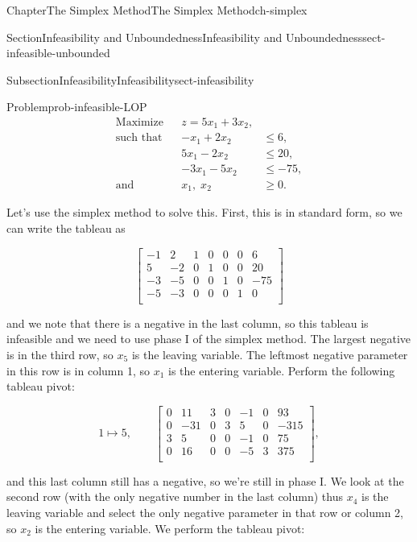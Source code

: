 \documentclass[oneside,10pt,]{book}
\numberwithin{equation}{section}
\newcommand{\amp}{&}
\begin{document}
\begin{chapterptx}{Chapter}{The Simplex Method}{}{The Simplex Method}{}{}{ch-simplex}
\begin{sectionptx}{Section}{Infeasibility and Unboundedness}{}{Infeasibility and Unboundedness}{}{}{sect-infeasible-unbounded}
\begin{subsectionptx}{Subsection}{Infeasibility}{}{Infeasibility}{}{}{sect-infeasibility}
\begin{problem}{Problem}{}{prob-infeasible-LOP}
%
\begin{equation*}
\begin{aligned} \text{Maximize} \amp \amp z  = 5x_1 + 3x_2, \amp \\ \text{such that} \amp\amp  -x_1 +2x_2 \amp \leq 6, \\ \amp\amp 5x_1 -2x_2 \amp \leq 20, \\ \amp\amp -3x_1 - 5x_2 \amp \leq -75,\\ \text{and} \amp\amp x_1, \; x_2 \amp \geq 0.
\end{aligned}
\end{equation*}
%
\end{problem}
Let's use the simplex method to solve this. First, this is in standard form, so we can write the tableau as%
\par
%
\begin{equation*}
\left[\begin{array}{rr|rrrr|r} -1 \amp 2 \amp 1 \amp 0 \amp 0 \amp 0 \amp 6\\ 5 \amp -2 \amp 0 \amp 1 \amp 0 \amp 0 \amp 20\\ -3 \amp -5 \amp 0 \amp 0 \amp 1 \amp 0 \amp -75\\ \hline -5 \amp -3 \amp 0 \amp 0 \amp 0 \amp 1 \amp 0\\ \end{array} \right]
\end{equation*}
%
\par
and we note that there is a negative in the last column, so this tableau is infeasible and we need to use phase I of the simplex method. The largest negative is in the third row, so \(x_5\) is the leaving variable.  The leftmost negative parameter in this row is in column 1, so \(x_1\) is the entering variable.  Perform the following tableau pivot:%
\par
%
\begin{equation*}
1 \mapsto 5, \qquad \left[\begin{array}{rr|rrrr|r} 0 \amp 11 \amp 3 \amp 0 \amp -1 \amp 0 \amp 93\\ 0 \amp -31 \amp 0 \amp 3 \amp 5 \amp 0 \amp -315\\ 3 \amp 5 \amp 0 \amp 0 \amp -1 \amp 0 \amp 75\\ \hline 0 \amp 16 \amp 0 \amp 0 \amp -5 \amp 3 \amp 375\\ \end{array} \right],
\end{equation*}
%
\par
and this last column still has a negative, so we're still in phase I. We look at the second row (with the only negative number in the last column) thus \(x_4\) is the leaving variable and select the only negative parameter in that row or column 2, so \(x_2\) is the entering variable. We perform the tableau pivot:%

\end{subsectionptx}
\end{sectionptx}
\end{chapterptx}
\end{document}
